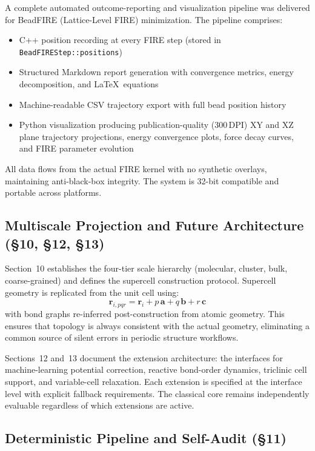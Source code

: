 \documentclass[11pt]{article}
\begin{document}
A complete automated outcome-reporting and visualization pipeline
was delivered for BeadFIRE (Lattice-Level FIRE) minimization.
The pipeline comprises:
\begin{itemize}
\item C++ position recording at every FIRE step (stored in
      \texttt{BeadFIREStep::positions})
\item Structured Markdown report generation with convergence
      metrics, energy decomposition, and \LaTeX\ equations
\item Machine-readable CSV trajectory export with full bead
      position history
\item Python visualization producing publication-quality
      (300\,DPI) XY and XZ plane trajectory projections, energy
      convergence plots, force decay curves, and FIRE parameter
      evolution
\end{itemize}
All data flows from the actual FIRE kernel with no synthetic
overlays, maintaining anti-black-box integrity.  The system is
32-bit compatible and portable across platforms.

\subsection{Multiscale Projection and Future Architecture (\S10, \S12, \S13)}

Section~10 establishes the four-tier scale hierarchy
(molecular, cluster, bulk, coarse-grained) and defines the
supercell construction protocol.  Supercell geometry is replicated
from the unit cell using:
\[
\mathbf{r}_{i,pqr} = \mathbf{r}_i + p\,\mathbf{a}
+ q\,\mathbf{b} + r\,\mathbf{c}
\]
with bond graphs re-inferred post-construction from atomic
geometry.  This ensures that topology is always consistent with
the actual geometry, eliminating a common source of silent
errors in periodic structure workflows.

Sections~12 and~13 document the extension architecture: the
interfaces for machine-learning potential correction, reactive
bond-order dynamics, triclinic cell support, and variable-cell
relaxation.  Each extension is specified at the interface level
with explicit fallback requirements.  The classical core remains
independently evaluable regardless of which extensions are active.

\subsection{Deterministic Pipeline and Self-Audit (\S11)}
\end{document}
